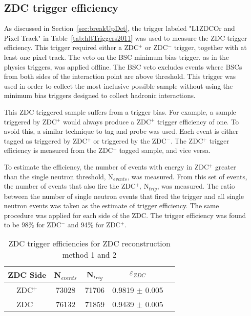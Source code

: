     \subsection{ZDC trigger efficiency}
      As discussed in Section~\ref{sec:breakUpDet}, the trigger labeled 
        "L1ZDCOr and Pixel Track" in Table~\ref{tab:hltTriggers2011} was used 
        to measure the ZDC trigger efficiency. 
      This trigger required either a ZDC$^{+}$ or ZDC$^{-}$ trigger, together with at 
        least one pixel track. 
      The veto on the BSC minimum bias trigger, as in the physics triggers, was
        applied offline.
      The BSC veto excludes events where BSCs from both sides of the 
        interaction point are above threshold. 
      This trigger was used in order to collect the most inclusive possible 
        sample without using the minimum bias triggers designed to collect 
        hadronic interactions.
        
      This ZDC triggered sample suffers from a trigger bias. 
      For example, a sample triggered by ZDC$^{+}$ would always produce a 
        ZDC$^{+}$ trigger efficiency of one. 
      To avoid this, a similar technique to tag and probe was used.
      Each event is either tagged as triggered by ZDC$^{+}$ or triggered 
        by the ZDC$^{-}$. 
      The ZDC$^{+}$ trigger efficiency is measured from the ZDC$^{-}$ tagged 
        sample, and vice versa.

      To estimate the efficiency, the number of events with energy in 
        ZDC$^{+}$ greater than the single neutron threshold, N$_{events}$, 
        was measured.
      From this set of events, the number of events that also fire the 
        ZDC$^{+}$, N$_{trig}$, was measured.
      The ratio between the number of single neutron events that fired the 
        trigger and all single neutron events was taken as the estimate of 
        trigger efficiency. 
      The same procedure was applied for each side of the ZDC.
      The trigger efficiency was found to be 98\% for ZDC$^{-}$
        and 94\% for ZDC$^{+}$.

      \begin{table}
        \centering
        \begin{tabular}{|c|c|c|c|c|}
           \hline ZDC Side & N$_{events}$ & N$_{trig}$ & $\varepsilon_{ZDC}$ \\ \hline
           ZDC$^{+}$ & 73028  & 71706  & 0.9819  $\pm$ 0.005  \\ \hline
           ZDC$^{-}$ & 76132  & 71859  & 0.9439  $\pm$ 0.005  \\ \hline
        \end{tabular}
        \caption{ZDC trigger efficiencies for ZDC reconstruction method 1 and 
          2}
        \label{tab:zdcEfficiency}
      \end{table}

